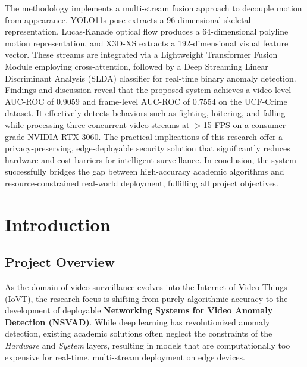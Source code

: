 \documentclass[12pt]{article}
\begin{document}
\vspace{0.3cm}
\noindent The methodology implements a multi-stream fusion approach to decouple motion from appearance. YOLO11s-pose extracts a 96-dimensional skeletal representation, Lucas-Kanade optical flow produces a 64-dimensional polyline motion representation, and X3D-XS extracts a 192-dimensional visual feature vector. These streams are integrated via a Lightweight Transformer Fusion Module employing cross-attention, followed by a Deep Streaming Linear Discriminant Analysis (SLDA) classifier for real-time binary anomaly detection. Findings and discussion reveal that the proposed system achieves a video-level AUC-ROC of 0.9059 and frame-level AUC-ROC of 0.7554 on the UCF-Crime dataset. It effectively detects behaviors such as fighting, loitering, and falling while processing three concurrent video streams at $>$15 FPS on a consumer-grade NVIDIA RTX 3060. The practical implications of this research offer a privacy-preserving, edge-deployable security solution that significantly reduces hardware and cost barriers for intelligent surveillance. In conclusion, the system successfully bridges the gap between high-accuracy academic algorithms and resource-constrained real-world deployment, fulfilling all project objectives.

\vfill
\clearpage

\tableofcontents
\clearpage

\section{Introduction}

\subsection{Project Overview}
As the domain of video surveillance evolves into the Internet of Video Things (IoVT), the research focus is shifting from purely algorithmic accuracy to the development of deployable \textbf{Networking Systems for Video Anomaly Detection (NSVAD)}. While deep learning has revolutionized anomaly detection, existing academic solutions often neglect the constraints of the \textit{Hardware} and \textit{System} layers, resulting in models that are computationally too expensive for real-time, multi-stream deployment on edge devices.
\end{document}
